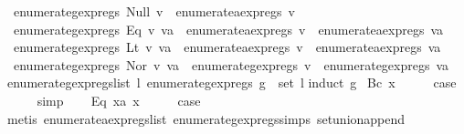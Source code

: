 \begin{isabellebody}
\ \ {\isachardoublequoteopen}enumerate{\isacharunderscore}gexp{\isacharunderscore}regs\ {\isacharparenleft}Null\ v{\isacharparenright}\ {\isacharequal}\ enumerate{\isacharunderscore}aexp{\isacharunderscore}regs\ v{\isachardoublequoteclose}\ {\isacharbar}\isanewline
\ \ {\isachardoublequoteopen}enumerate{\isacharunderscore}gexp{\isacharunderscore}regs\ {\isacharparenleft}Eq\ v\ va{\isacharparenright}\ {\isacharequal}\ enumerate{\isacharunderscore}aexp{\isacharunderscore}regs\ v\ {\isasymunion}\ enumerate{\isacharunderscore}aexp{\isacharunderscore}regs\ va{\isachardoublequoteclose}\ {\isacharbar}\isanewline
\ \ {\isachardoublequoteopen}enumerate{\isacharunderscore}gexp{\isacharunderscore}regs\ {\isacharparenleft}Lt\ v\ va{\isacharparenright}\ {\isacharequal}\ enumerate{\isacharunderscore}aexp{\isacharunderscore}regs\ v\ {\isasymunion}\ enumerate{\isacharunderscore}aexp{\isacharunderscore}regs\ va{\isachardoublequoteclose}\ {\isacharbar}\isanewline
\ \ {\isachardoublequoteopen}enumerate{\isacharunderscore}gexp{\isacharunderscore}regs\ {\isacharparenleft}Nor\ v\ va{\isacharparenright}\ {\isacharequal}\ enumerate{\isacharunderscore}gexp{\isacharunderscore}regs\ v\ {\isasymunion}\ enumerate{\isacharunderscore}gexp{\isacharunderscore}regs\ va{\isachardoublequoteclose}\isanewline
\isanewline
{}\isamarkupfalse%
\ enumerate{\isacharunderscore}gexp{\isacharunderscore}regs{\isacharunderscore}list{\isacharcolon}\ {\isachardoublequoteopen}{\isasymexists}l{\isachardot}\ enumerate{\isacharunderscore}gexp{\isacharunderscore}regs\ g\ {\isacharequal}\ set\ l{\isachardoublequoteclose}\isanewline
%
\isadelimproof
%
\endisadelimproof
%
\isatagproof
{}\isamarkupfalse%
{\isacharparenleft}induct\ g{\isacharparenright}\isanewline
{}\isamarkupfalse%
\ {\isacharparenleft}Bc\ x{\isacharparenright}\isanewline
\ \ \isamarkupfalse%
\ \isamarkupfalse%
\ {\isacharquery}case\isanewline
\ \ \ \ \isamarkupfalse%
\ simp\isanewline
{}\isamarkupfalse%
\isanewline
\ \ \isamarkupfalse%
\ {\isacharparenleft}Eq\ x{}a\ x{}{\isacharparenright}\isanewline
\ \ \isamarkupfalse%
\ \isamarkupfalse%
\ {\isacharquery}case\isanewline
\ \ \ \ \isamarkupfalse%
\ {\isacharparenleft}metis\ enumerate{\isacharunderscore}aexp{\isacharunderscore}regs{\isacharunderscore}list\ enumerate{\isacharunderscore}gexp{\isacharunderscore}regs{\isachardot}simps{\isacharparenleft}{}{\isacharparenright}\ set{\isacharunderscore}union{\isacharunderscore}append{\isacharparenright}\isanewline

\end{isabellebody}

